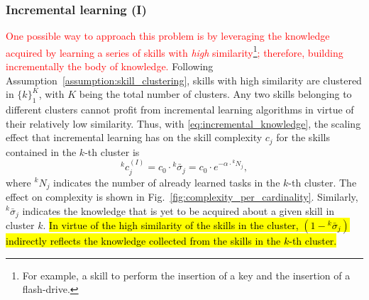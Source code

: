\subsubsection{\textbf{Incremental learning (I)}}
\textcolor{red}{One possible way to approach this problem is by leveraging the knowledge acquired by learning a series of skills with \emph{high} similarity\footnote{For example, a skill to perform the insertion of a key and the insertion of a flash-drive.}; therefore, building incrementally the body of knowledge.} Following Assumption~\ref{assumption:skill_clustering}, skills with high similarity are clustered in $\lbrace k \rbrace^{K}_1 $, with $K$ being the total number of clusters. Any two skills belonging to different clusters cannot profit from incremental learning algorithms in virtue of their relatively low similarity. Thus, with \eqref{eq:incremental_knowledge}, the scaling effect that incremental learning has on the skill complexity $c_j$ for the skills contained in the $k$-th cluster is
\begin{equation}\label{eq:complexity_TL}
  {^k}c^{(I)}_j = c_0 \cdot {^k}\bar{\sigma}_j = c_0 \cdot e^{-\alpha \cdot {^kN_{j}}},
\end{equation}
where ${^kN_{j}}$ indicates the number of already learned tasks in the $k$-th cluster. The effect on complexity is shown in Fig.~\ref{fig:complexity_per_cardinality}. Similarly, ${^k}\bar{\sigma}_j$ indicates the knowledge that is yet to be acquired about a given skill in cluster $k$. \hl{In virtue of the high similarity of the skills in the cluster, $(1-{^k}\bar{\sigma}_j)$ indirectly reflects the knowledge collected from the skills in the $k$-th cluster.}

